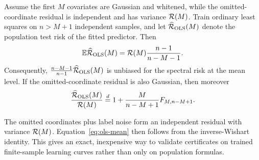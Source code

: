 \begin{proposition}
\label{prop:ols}
Assume the first $M$ covariates are Gaussian and whitened, while the omitted-coordinate residual is independent and has variance $\mathcal{R}(M)$. Train ordinary least squares on $n>M+1$ independent samples, and let $\widehat{\mathcal{R}}_{\mathrm{OLS}}(M)$ denote the population test risk of the fitted predictor. Then
\begin{equation}
 \mathbb{E}\widehat{\mathcal{R}}_{\mathrm{OLS}}(M)
 =\mathcal{R}(M)\frac{n-1}{n-M-1}.
 \label{eq:ols-mean}
\end{equation}
Consequently,
$\frac{n-M-1}{n-1}\widehat{\mathcal{R}}_{\mathrm{OLS}}(M)$ is unbiased for the spectral risk at the mean level. If the omitted-coordinate residual is also Gaussian, then moreover
\begin{equation}
 \frac{\widehat{\mathcal{R}}_{\mathrm{OLS}}(M)}{\mathcal{R}(M)}
 \overset d=1+\frac{M}{n-M+1}F_{M,n-M+1}.
 \label{eq:ols-distribution}
\end{equation}
\end{proposition}

The omitted coordinates plus label noise form an independent residual with variance $\mathcal{R}(M)$. Equation~\eqref{eq:ols-mean} then follows from the inverse-Wishart identity. This gives an exact, inexpensive way to validate certificates on trained finite-sample learning curves rather than only on population formulas.
